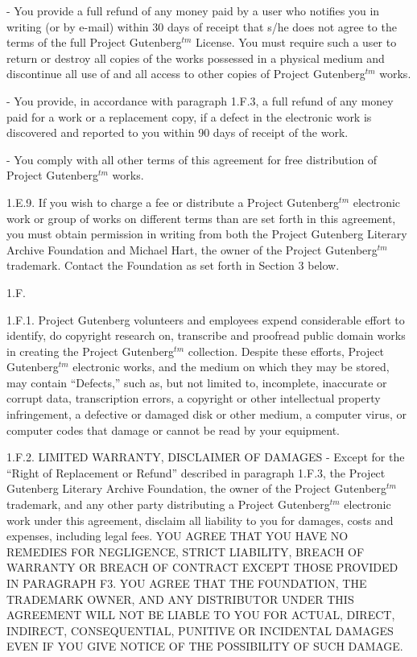 - You provide a full refund of any money paid by a user who notifies
     you in writing (or by e-mail) within 30 days of receipt that s/he
     does not agree to the terms of the full Project Gutenberg$^{tm}$
     License.  You must require such a user to return or
     destroy all copies of the works possessed in a physical medium
     and discontinue all use of and all access to other copies of
     Project Gutenberg$^{tm}$ works.

- You provide, in accordance with paragraph 1.F.3, a full refund of any
     money paid for a work or a replacement copy, if a defect in the
     electronic work is discovered and reported to you within 90 days
     of receipt of the work.

- You comply with all other terms of this agreement for free
     distribution of Project Gutenberg$^{tm}$ works.

1.E.9.  If you wish to charge a fee or distribute a Project Gutenberg$^{tm}$
electronic work or group of works on different terms than are set
forth in this agreement, you must obtain permission in writing from
both the Project Gutenberg Literary Archive Foundation and Michael
Hart, the owner of the Project Gutenberg$^{tm}$ trademark.  Contact the
Foundation as set forth in Section 3 below.

1.F.

1.F.1.  Project Gutenberg volunteers and employees expend considerable
effort to identify, do copyright research on, transcribe and proofread
public domain works in creating the Project Gutenberg$^{tm}$
collection.  Despite these efforts, Project Gutenberg$^{tm}$ electronic
works, and the medium on which they may be stored, may contain
“Defects,” such as, but not limited to, incomplete, inaccurate or
corrupt data, transcription errors, a copyright or other intellectual
property infringement, a defective or damaged disk or other medium, a
computer virus, or computer codes that damage or cannot be read by
your equipment.

1.F.2.  LIMITED WARRANTY, DISCLAIMER OF DAMAGES - Except for the “Right
of Replacement or Refund” described in paragraph 1.F.3, the Project
Gutenberg Literary Archive Foundation, the owner of the Project
Gutenberg$^{tm}$ trademark, and any other party distributing a Project
Gutenberg$^{tm}$ electronic work under this agreement, disclaim all
liability to you for damages, costs and expenses, including legal
fees.  YOU AGREE THAT YOU HAVE NO REMEDIES FOR NEGLIGENCE, STRICT
LIABILITY, BREACH OF WARRANTY OR BREACH OF CONTRACT EXCEPT THOSE
PROVIDED IN PARAGRAPH F3.  YOU AGREE THAT THE FOUNDATION, THE
TRADEMARK OWNER, AND ANY DISTRIBUTOR UNDER THIS AGREEMENT WILL NOT BE
LIABLE TO YOU FOR ACTUAL, DIRECT, INDIRECT, CONSEQUENTIAL, PUNITIVE OR
INCIDENTAL DAMAGES EVEN IF YOU GIVE NOTICE OF THE POSSIBILITY OF SUCH
DAMAGE.

